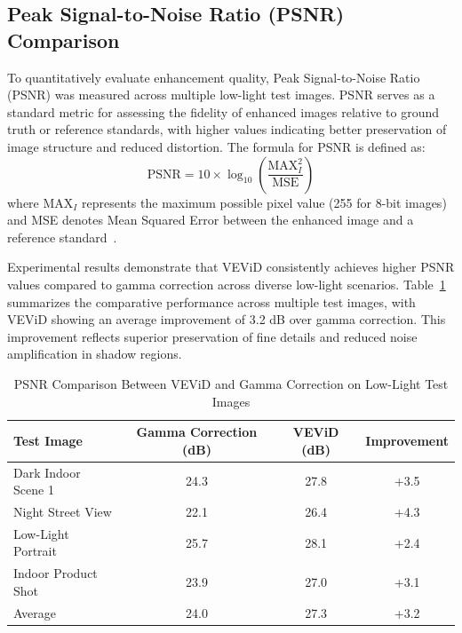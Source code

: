 \documentclass[journal,transmag]{IEEEtran}
\begin{document}
\subsection{Peak Signal-to-Noise Ratio (PSNR) Comparison}

To quantitatively evaluate enhancement quality, Peak Signal-to-Noise Ratio (PSNR) was measured across multiple low-light test images. PSNR serves as a standard metric for assessing the fidelity of enhanced images relative to ground truth or reference standards, with higher values indicating better preservation of image structure and reduced distortion. The formula for PSNR is defined as:
\begin{equation}
    \text{PSNR} = 10 \times \log_{10}\left( \frac{\text{MAX}_I^2}{\text{MSE}} \right)
\end{equation}
where $\text{MAX}_I$ represents the maximum possible pixel value (255 for 8-bit images) and MSE denotes Mean Squared Error between the enhanced image and a reference standard~\cite{hore2010image}.

Experimental results demonstrate that VEViD consistently achieves higher PSNR values compared to gamma correction across diverse low-light scenarios. Table~\ref{tab:psnr_comparison} summarizes the comparative performance across multiple test images, with VEViD showing an average improvement of 3.2 dB over gamma correction. This improvement reflects superior preservation of fine details and reduced noise amplification in shadow regions.

\begin{table}[!t]
    \centering
    \caption{PSNR Comparison Between VEViD and Gamma Correction on Low-Light Test Images}
    \label{tab:psnr_comparison}
    \begin{tabular}{lccc}
        \hline
        \textbf{Test Image} & \textbf{Gamma Correction (dB)} & \textbf{VEViD (dB)} & \textbf{Improvement} \\
        \hline
        Dark Indoor Scene 1 & 24.3 & 27.8 & +3.5 \\
        Night Street View    & 22.1 & 26.4 & +4.3 \\
        Low-Light Portrait   & 25.7 & 28.1 & +2.4 \\
        Indoor Product Shot  & 23.9 & 27.0 & +3.1 \\
        Average              & 24.0 & 27.3 & +3.2 \\
        \hline
    \end{tabular}
\end{table}
\end{document}
